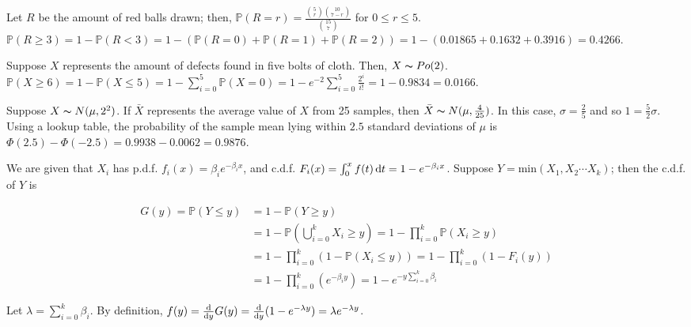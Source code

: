 
Let $R$ be the amount of red balls drawn; then, $\mathbb{P}(R = r) = \frac{\binom{5}{r} \binom{10}{7 - r}}{\binom{15}{7}}$ for $0 \leq r \leq 5$. $\mathbb{P}(R \geq 3) = 1 - \mathbb{P}(R < 3) = 1 - (\mathbb{P}(R = 0) + \mathbb{P}(R = 1) + \mathbb{P}(R = 2)) = 1 - (0.01865 + 0.1632 + 0.3916) = 0.4266$.


Suppose $X$ represents the amount of defects found in five bolts of cloth. Then, $X \thicksim Po(2)$. $\mathbb{P}(X \geq 6) = 1 - \mathbb{P}(X \leq 5) = 1 - \sum_{i = 0}^5 \mathbb{P}(X = 0) = 1 - e^{-2}\sum_{i = 0}^5\frac{2^i}{i!} = 1 - 0.9834 = 0.0166$.


Suppose $X \thicksim N(\mu, 2^2)$. If $\bar{X}$ represents the average value of $X$ from 25 samples, then $\bar{X} \thicksim N(\mu, \frac{4}{25})$. In this case, $\sigma = \frac{2}{5}$ and so $1 = \frac{5}{2}\sigma$. Using a lookup table, the probability of the sample mean lying within $2.5$ standard deviations of $\mu$ is $\Phi(2.5) - \Phi(-2.5) = 0.9938 - 0.0062 = 0.9876$.


We are given that $X_i$ has p.d.f. $f_i(x) = \beta_i e^{-\beta_i x}$, and c.d.f. $F_i(x) = \int_0^{x} f(t) \mathop{}\!\mathrm{d} t = 1 - e^{-\beta_i x}$. Suppose $Y = \text{min}(X_1, X_2 \cdots X_k)$; then the c.d.f. of $Y$ is

\begin{align*}
  G(y) = \mathbb{P}(Y \leq y) &= 1 - \mathbb{P}(Y \geq y) \\
  &= 1 - \mathbb{P}(\bigcup_{i = 0}^k X_i \geq y) = 1 - \prod_{i = 0}^k\mathbb{P}(X_i \geq y) \\
  &= 1 - \prod_{i = 0}^k(1 - \mathbb{P}(X_i \leq y)) = 1 - \prod_{i = 0}^k(1 - F_i(y)) \\
  &= 1 - \prod_{i = 0}^k(e^{-\beta_i y}) = 1 - e^{-y\sum_{i = 0}^k \beta_i}
\end{align*}

Let $\lambda = \sum_{i = 0}^k \beta_i$. By definition, $f(y) = \frac{\mathop{}\!\mathrm{d}}{\mathop{}\!\mathrm{d} y} G(y) = \frac{\mathop{}\!\mathrm{d}}{\mathop{}\!\mathrm{d} y} (1 - e^{-\lambda y}) = \lambda e^{-\lambda y}$.


